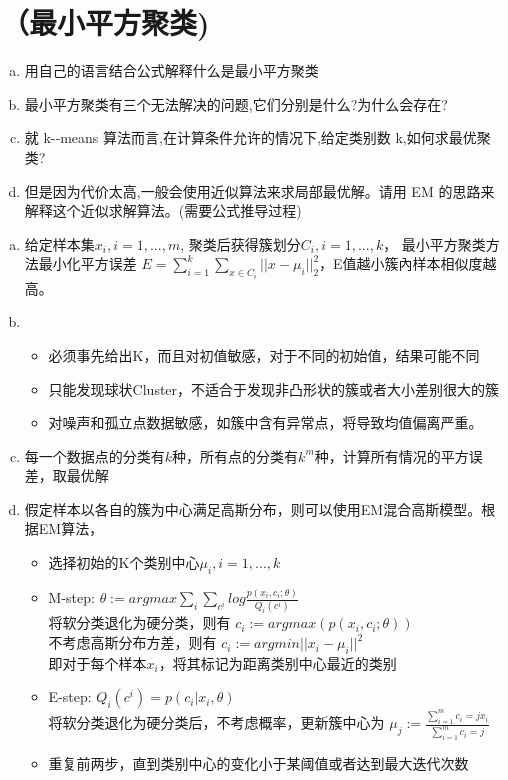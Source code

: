 \documentclass[11pt]{article}
\newenvironment{answer}{\par\color{MidnightBlue}}{\par}
\begin{document}
\section{（最小平方聚类)}
\begin{enumerate}[(a)]
    \item 用自己的语言结合公式解释什么是最小平方聚类
    \item 最小平方聚类有三个无法解决的问题,它们分别是什么?为什么会存在?
    \item 就 k-­‐means 算法而言,在计算条件允许的情况下,给定类别数 k,如何求最优聚类?
    \item 但是因为代价太高,一般会使用近似算法来求局部最优解。请用 EM 的思路来解释这个近似求解算法。(需要公式推导过程)
\end{enumerate}
\begin{answer}
\begin{enumerate}[(a)]
\item 给定样本集${x_i}, i = 1,..., m$, 聚类后获得簇划分${C_i, i = 1,..., k}$， 最小平方聚类方法最小化平方误差
$E = \sum_{i=1}^k\sum_{x\in C_i}||x-\mu_i||_2^2$，E值越小簇內样本相似度越高。
\item \begin{itemize}
  \item 必须事先给出K，而且对初值敏感，对于不同的初始值，结果可能不同
  \item 只能发现球状Cluster，不适合于发现非凸形状的簇或者大小差别很大的簇
  \item 对噪声和孤立点数据敏感，如簇中含有异常点，将导致均值偏离严重。
\end{itemize}
\item 每一个数据点的分类有$k$种，所有点的分类有$k^m$种，计算所有情况的平方误差，取最优解
\item 假定样本以各自的簇为中心满足高斯分布，则可以使用EM混合高斯模型。根据EM算法，\begin{itemize}
  \item 选择初始的K个类别中心${\mu_i}, i = 1,..., k$
  \item M-step: $\theta := arg max\sum_i\sum_{c^i}log\frac{p(x_i,c_i;\theta)}{Q_i(c^i)}$ \\
  将软分类退化为硬分类，则有 $c_i := arg max(p(x_i,c_i;\theta))$ \\
  不考虑高斯分布方差，则有 $c_i := arg min||x_i - \mu_i||^2$  \\
  即对于每个样本$x_i$，将其标记为距离类别中心最近的类别
  \item E-step: $Q_i(c^i) = p(c_i|x_i,\theta)$ \\
  将软分类退化为硬分类后，不考虑概率，更新簇中心为 $\mu_j := \frac{\sum_{i=1}^m{c_i=j}x_i}{\sum_{i=1}^m{c_i=j}}$ \\
  \item 重复前两步，直到类别中心的变化小于某阈值或者达到最大迭代次数
\end{itemize}
\end{enumerate}
\end{answer}
\end{document}
